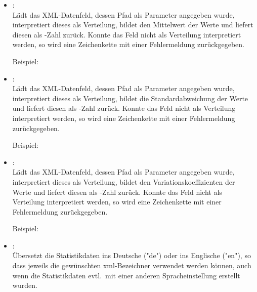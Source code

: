\begin{itemize}
\item
{}:\\
Lädt das XML-Datenfeld, dessen Pfad als Parameter angegeben wurde, interpretiert dieses als Verteilung,
bildet den Mittelwert der Werte und liefert diesen als -Zahl zurück.
Konnte das Feld nicht als Verteilung interpretiert werden, so wird eine Zeichenkette mit einer Fehlermeldung
zurückgegeben.

Beispiel:\\

\item
{}:\\
Lädt das XML-Datenfeld, dessen Pfad als Parameter angegeben wurde, interpretiert dieses als Verteilung,
bildet die Standardabweichung der Werte und liefert diesen als -Zahl zurück.
Konnte das Feld nicht als Verteilung interpretiert werden, so wird eine Zeichenkette mit einer Fehlermeldung
zurückgegeben.

Beispiel:\\

\item
{}:\\
Lädt das XML-Datenfeld, dessen Pfad als Parameter angegeben wurde, interpretiert dieses als Verteilung,
bildet den Variationskoeffizienten der Werte und liefert diesen als -Zahl zurück.
Konnte das Feld nicht als Verteilung interpretiert werden, so wird eine Zeichenkette mit einer Fehlermeldung
zurückgegeben.

Beispiel:\\

\item
{}:\\
Übersetzt die Statistikdaten ins Deutsche ("{}de") oder ins Englische ("{}en"), so dass jeweils die gewünschten
xml-Bezeichner verwendet werden können, auch wenn die Statistikdaten evtl.\ mit einer anderen Spracheinstellung
erstellt wurden.

\end{itemize}

